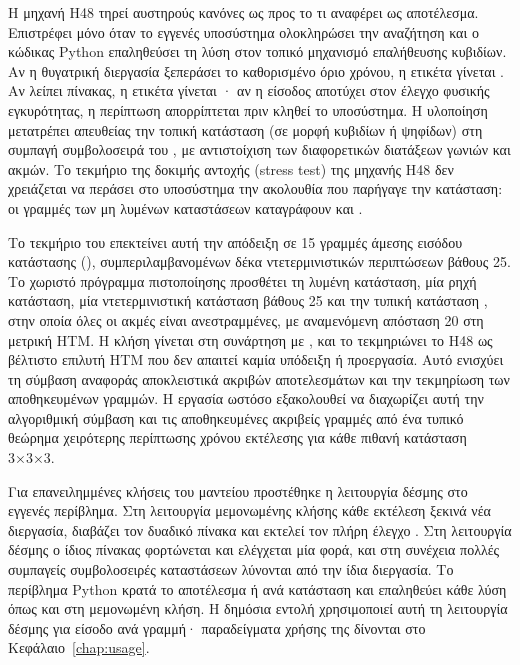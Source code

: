 \begin{table}[htbp]\centering

\caption{Μεταδεδομένα των παραγόμενων πινάκων αποκοπής H48 ανά επίπεδο και προφίλ: μέγεθος σε bytes, πρόθεμα SHA-256 και κατάσταση παραγωγής, από τα τεκμήρια .}
\label{tab:h48-metadata}
\end{table}

Η μηχανή H48 τηρεί αυστηρούς κανόνες ως προς το τι αναφέρει ως αποτέλεσμα. Επιστρέφει  μόνο όταν το εγγενές υποσύστημα ολοκληρώσει την αναζήτηση και ο κώδικας Python επαληθεύσει τη λύση στον τοπικό μηχανισμό επαλήθευσης κυβιδίων. Αν η θυγατρική διεργασία ξεπεράσει το καθορισμένο όριο χρόνου, η ετικέτα γίνεται . Αν λείπει πίνακας, η ετικέτα γίνεται · αν η είσοδος αποτύχει στον έλεγχο φυσικής εγκυρότητας, η περίπτωση απορρίπτεται πριν κληθεί το υποσύστημα. Η υλοποίηση μετατρέπει απευθείας την τοπική κατάσταση (σε μορφή κυβιδίων ή ψηφίδων) στη συμπαγή συμβολοσειρά του , με αντιστοίχιση των διαφορετικών διατάξεων γωνιών και ακμών. Το τεκμήριο της δοκιμής αντοχής (stress test) της μηχανής H48 δεν χρειάζεται να περάσει στο υποσύστημα την ακολουθία που παρήγαγε την κατάσταση: οι γραμμές των μη λυμένων καταστάσεων καταγράφουν  και .

Το τεκμήριο του  επεκτείνει αυτή την απόδειξη σε 15 γραμμές άμεσης εισόδου κατάστασης (), συμπεριλαμβανομένων δέκα ντετερμινιστικών περιπτώσεων βάθους 25. Το χωριστό πρόγραμμα πιστοποίησης προσθέτει τη λυμένη κατάσταση, μία ρηχή κατάσταση, μία ντετερμινιστική κατάσταση βάθους 25 και την τυπική κατάσταση , στην οποία όλες οι ακμές είναι ανεστραμμένες, με αναμενόμενη απόσταση 20 στη μετρική HTM. Η κλήση γίνεται στη συνάρτηση  με , και το  τεκμηριώνει το H48 ως βέλτιστο επιλυτή HTM που δεν απαιτεί καμία υπόδειξη ή προεργασία. Αυτό ενισχύει τη σύμβαση αναφοράς αποκλειστικά ακριβών αποτελεσμάτων και την τεκμηρίωση των αποθηκευμένων γραμμών. Η εργασία ωστόσο εξακολουθεί να διαχωρίζει αυτή την αλγοριθμική σύμβαση και τις αποθηκευμένες ακριβείς γραμμές από ένα τυπικό θεώρημα χειρότερης περίπτωσης χρόνου εκτέλεσης για κάθε πιθανή κατάσταση 3×3×3.

Για επανειλημμένες κλήσεις του μαντείου προστέθηκε η λειτουργία δέσμης  στο εγγενές περίβλημα. Στη λειτουργία μεμονωμένης κλήσης κάθε εκτέλεση ξεκινά νέα διεργασία, διαβάζει τον δυαδικό πίνακα  και εκτελεί τον πλήρη έλεγχο . Στη λειτουργία δέσμης ο ίδιος πίνακας φορτώνεται και ελέγχεται μία φορά, και στη συνέχεια πολλές συμπαγείς συμβολοσειρές καταστάσεων λύνονται από την ίδια διεργασία. Το περίβλημα Python  κρατά το αποτέλεσμα  ή  ανά κατάσταση και επαληθεύει κάθε λύση όπως και στη μεμονωμένη κλήση. Η δημόσια εντολή  χρησιμοποιεί αυτή τη λειτουργία δέσμης για είσοδο ανά γραμμή· παραδείγματα χρήσης της δίνονται στο Κεφάλαιο~\ref{chap:usage}.

